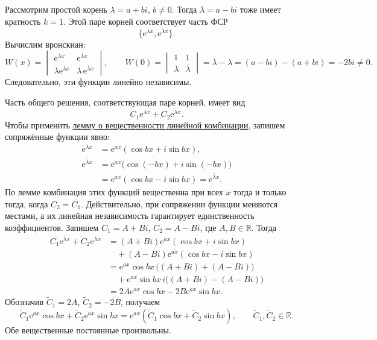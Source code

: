 \documentclass[12pt,a4paper]{article}
\numberwithin{equation}{section}
\newcommand{\R}{\mathbb{R}}
\newcommand{\e}{\mathrm{e}}
\begin{document}
Рассмотрим простой корень \(\lambda=a+bi\), \(b\ne0\). Тогда
\(\overline\lambda=a-bi\) тоже имеет кратность \(k=1\). Этой паре
корней соответствует часть ФСР
\[
 \bigl\{\e^{\lambda x},\e^{\overline\lambda x}\bigr\}.
\]
Вычислим вронскиан:
\[
 W(x)=
 \begin{vmatrix}
  \e^{\lambda x}&\e^{\overline\lambda x}\\
  \lambda\e^{\lambda x}&\overline\lambda\,\e^{\overline\lambda x}
 \end{vmatrix},\qquad
 W(0)=
 \begin{vmatrix}1&1\\ \lambda&\overline\lambda\end{vmatrix}
 =\overline\lambda-\lambda=(a-bi)-(a+bi)=-2bi\ne0.
\]
Следовательно, эти функции линейно независимы.

Часть общего решения, соответствующая паре корней, имеет вид
\[
 C_1\e^{\lambda x}+C_2\e^{\overline\lambda x}.
\]
Чтобы применить \hyperref[lem:real-linear-combination]{лемму о вещественности
линейной комбинации}, запишем сопряжённые функции явно:
\[
\begin{aligned}
 \e^{\lambda x}
 &=\e^{ax}(\cos bx+i\sin bx),\\
 \e^{\overline\lambda x}
 &=\e^{ax}\bigl(\cos(-bx)+i\sin(-bx)\bigr)\\
 &=\e^{ax}(\cos bx-i\sin bx)=\overline{\e^{\lambda x}}.
\end{aligned}
\]
По лемме комбинация этих функций вещественна при всех \(x\) тогда и только тогда,
когда \(C_2=\overline{C_1}\). Действительно, при сопряжении функции меняются
местами, а их линейная независимость гарантирует единственность коэффициентов. Запишем \(C_1=A+Bi\), \(C_2=A-Bi\),
где \(A,B\in\R\). Тогда
\[
\begin{aligned}
 C_1\e^{\lambda x}+C_2\e^{\overline\lambda x}
 &= (A+Bi)\e^{ax}(\cos bx+i\sin bx)\\
 &\quad +(A-Bi)\e^{ax}(\cos bx-i\sin bx)\\
 &= \e^{ax}\cos bx\,\bigl((A+Bi)+(A-Bi)\bigr)\\
 &\quad +\e^{ax}\sin bx\,i\bigl((A+Bi)-(A-Bi)\bigr)\\
 &=2A\e^{ax}\cos bx-2B\e^{ax}\sin bx.
\end{aligned}
\]
Обозначив \(\widetilde C_1=2A\), \(\widetilde C_2=-2B\), получаем
\[
 \widetilde C_1\e^{ax}\cos bx+\widetilde C_2\e^{ax}\sin bx
 =\e^{ax}(\widetilde C_1\cos bx+\widetilde C_2\sin bx),
 \qquad \widetilde C_1,\widetilde C_2\in\R.
\]
Обе вещественные постоянные произвольны.
\end{document}
